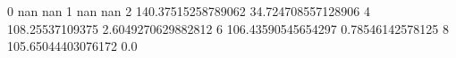 0 nan nan
1 nan nan
2 140.37515258789062 34.724708557128906
4 108.25537109375 2.6049270629882812
6 106.43590545654297 0.78546142578125
8 105.65044403076172 0.0
